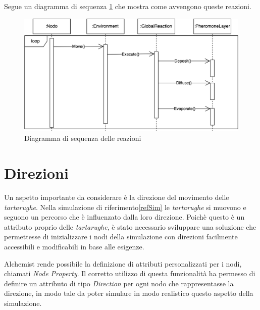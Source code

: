 Segue un diagramma di sequenza \cref{fig:seq3} che mostra come avvengono queste reazioni.
\begin{figure}[ht]
    \centering
    \includegraphics[width=.7\linewidth]{figures/seq3.png}
    \caption{Diagramma di sequenza delle reazioni}\label{fig:seq3}
\end{figure}

\section{Direzioni}
Un aspetto importante da considerare è la direzione del movimento delle \textit{tartarughe}. Nella simulazione di riferimento\space\ref{refSim} le \textit{tartarughe}
si muovono e seguono un percorso che è influenzato dalla loro direzione. Poichè questo è un attributo proprio delle \textit{tartarughe},
è stato necessario sviluppare una soluzione che permettesse di inizializzare i nodi della simulazione con direzioni facilmente accessibili 
e modificabili in base alle esigenze.

Alchemist rende possibile la definizione di attributi personalizzati per i nodi, chiamati \textit{Node Property}. Il corretto utilizzo di questa
funzionalità ha permesso di definire un attributo di tipo \textit{Direction} per ogni nodo che rappresentasse la direzione, 
in modo tale da poter simulare in modo realistico questo aspetto della simulazione.